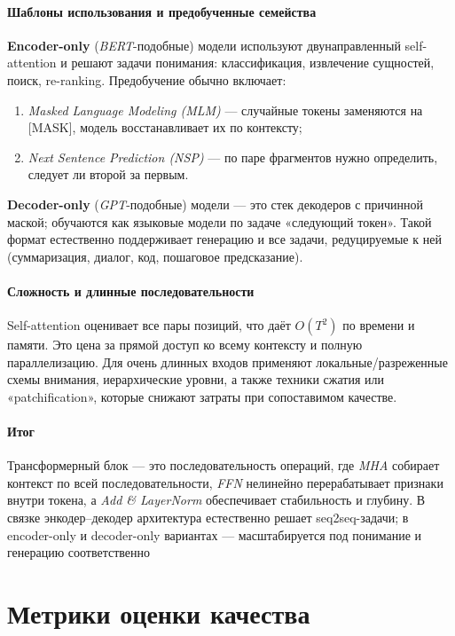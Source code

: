 \documentclass[12pt,a4paper]{article}
\begin{document}
\paragraph{Шаблоны использования и предобученные семейства}
\textbf{Encoder-only} (\textit{BERT}-подобные) модели используют двунаправленный self-attention и решают задачи понимания: классификация, извлечение сущностей, поиск, re-ranking. Предобучение обычно включает:
\begin{enumerate}\itemsep0pt
  \item \textit{Masked Language Modeling (MLM)} — случайные токены заменяются на [MASK], модель восстанавливает их по контексту;
  \item \textit{Next Sentence Prediction (NSP)} — по паре фрагментов нужно определить, следует ли второй за первым.
\end{enumerate}
\textbf{Decoder-only} (\textit{GPT}-подобные) модели — это стек декодеров с причинной маской; обучаются как языковые модели по задаче «следующий токен». Такой формат естественно поддерживает генерацию и все задачи, редуцируемые к ней (суммаризация, диалог, код, пошаговое предсказание).

\paragraph{Сложность и длинные последовательности}
Self-attention оценивает все пары позиций, что даёт $O(T^2)$ по времени и памяти. Это цена за прямой доступ ко всему контексту и полную параллелизацию. Для очень длинных входов применяют локальные/разреженные схемы внимания, иерархические уровни, а также техники сжатия или «patchification», которые снижают затраты при сопоставимом качестве.

\paragraph{Итог}
Трансформерный блок — это последовательность операций, где \textit{MHA} собирает контекст по всей последовательности, \textit{FFN} нелинейно перерабатывает признаки внутри токена, а \textit{Add \& LayerNorm} обеспечивает стабильность и глубину. В связке энкодер–декодер архитектура естественно решает seq2seq-задачи; в encoder-only и decoder-only вариантах — масштабируется под понимание и генерацию соответственно

\section{Метрики оценки качества}
\end{document}
